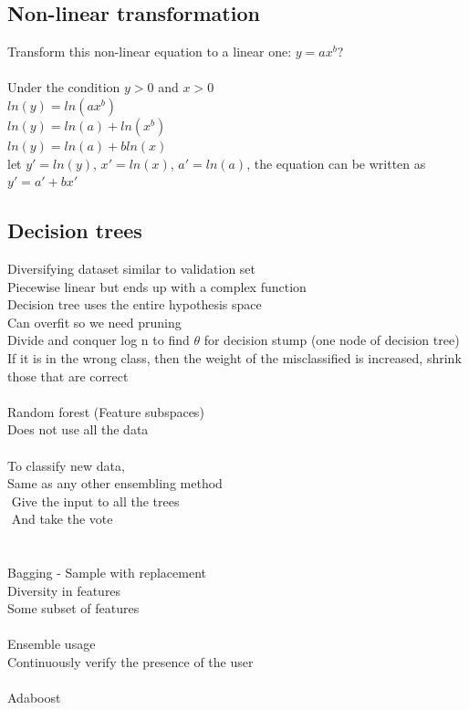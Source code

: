 \documentclass[11pt]{article}
\begin{document}
\subsection*{Non-linear transformation}
Transform this non-linear equation to a linear one: $y = ax^b$?
\\\\
 Under the condition $y>0$ and $x>0$
 \\
$ln(y)=ln(ax^b)$
\\
$ln(y)=ln(a)+ln(x^b)$
\\
$ln(y)=ln(a)+bln(x)$
\\
let $y'=ln(y)$, $x'=ln(x)$, $a'=ln(a)$, the equation can be written as $y'=a'+bx'$
\subsection*{Decision trees}
Diversifying dataset similar to validation set\\
Piecewise linear but ends up with a complex function\\
Decision tree uses the entire hypothesis space\\
Can overfit so we need pruning
\\
Divide and conquer log n to find $\theta$ for decision stump (one node of decision tree)
\\
If it is in the wrong class, then the weight of the misclassified is increased, shrink those that are correct\\\\
Random forest (Feature subspaces) \\
Does not use all the data\\
\\
To classify new data, \\
Same as any other ensembling method\\ Give the input to all the trees\\ And take the vote\\ \\\\
Bagging - Sample with replacement\\
Diversity in features\\
Some subset of features\\
\\
Ensemble usage\\
Continuously verify the presence of the user
\\\\
Adaboost\\
\end{document}
